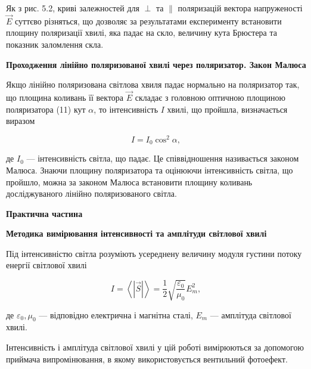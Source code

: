 \documentclass[12pt,a4paper]{article}
\begin{document}
    Як з рис. 5.2, криві залежностей для $\perp$ та $\parallel$ поляризацій вектора напруженості $\vec{E}$
    суттєво різняться, що дозволяє за результатами експерименту встановити площину
    поляризації хвилі, яка падає на скло, величину кута Брюстера та показник заломлення
    скла.

    \begin{center} \textbf{Проходження лінійно поляризованої хвилі через поляризатор. Закон Малюса} \end{center}

    Якщо лінійно поляризована світлова хвиля падає нормально на поляризатор так,
    що площина коливань її вектора $\vec{E}$ складає з головною оптичною площиною
    поляризатора (11) кут $\alpha$, то інтенсивність $I$ хвилі, що пройшла, визначається
    виразом

    \begin{equation}
        I = I_0 \cos^2 \alpha,
        \tag{5.2}
    \end{equation}

    де $I_0$ --- інтенсивність світла, що падає. Це співвідношення називається законом Малюса.
    Знаючи площину поляризатора та оцінюючи інтенсивність світла, що пройшло, можна
    за законом Малюса встановити площину коливань досліджуваного лінійно
    поляризованого світла.

    \begin{center} \textbf{\large Практична частина} \end{center}

    \begin{center} \textbf{Методика вимірювання інтенсивності та амплітуди світлової хвилі} \end{center}

    Під інтенсивністю світла розуміють усереднену величину модуля
    густини потоку енергії світлової хвилі

    \begin{equation}
        I = \left\langle \left| \vec{S} \right| \right\rangle = \frac{1}{2} \sqrt{\frac{\varepsilon_0}{\mu_0}}E_m^2,
        \tag{5.3}
    \end{equation}

    де $\varepsilon_0, \mu_0$ --- відповідно електрична і магнітна сталі,
    $E_m$ --- амплітуда світлової хвилі.

    Інтенсивність і амплітуда світлової хвилі у цій роботі вимірюються за допомогою
    приймача випромінювання, в якому використовується вентильний фотоефект.
\end{document}

